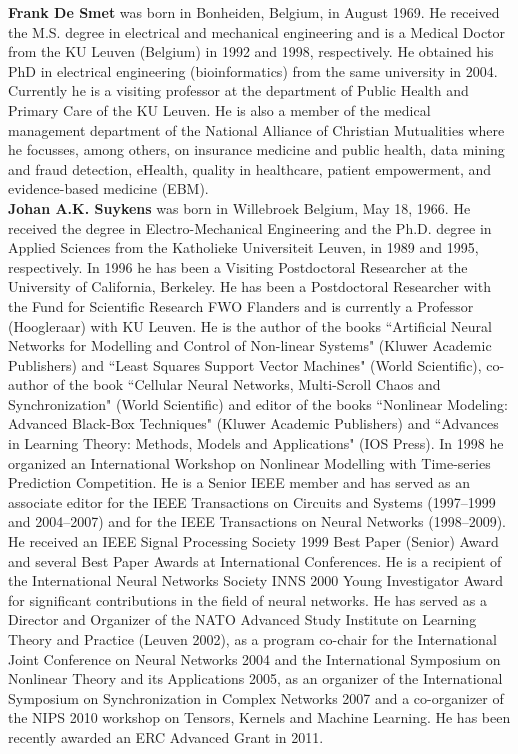 \documentclass[preprint,elsarticle-num,12pt]{elsarticle}
\begin{document}
{\noindent}\textbf{Frank De Smet} was born in Bonheiden, Belgium, in August 1969. He received the M.S. degree in electrical and mechanical engineering and is a Medical Doctor from the KU Leuven (Belgium) in 1992 and 1998, respectively. He obtained his PhD in electrical engineering (bioinformatics) from the same university in 2004. Currently he is a visiting professor at the department of Public Health and Primary Care of the KU Leuven. He is also a member of the medical management department of the National Alliance of Christian Mutualities where he focusses, among others, on insurance medicine and public health, data mining and fraud detection, eHealth, quality in healthcare, patient empowerment, and evidence-based medicine (EBM).\\

{\noindent}\textbf{Johan A.K. Suykens} was born in Willebroek Belgium, May 18, 1966. He received the degree in Electro-Mechanical Engineering and the Ph.D. degree in Applied Sciences from the Katholieke Universiteit Leuven, in 1989 and 1995, respectively. In 1996 he has been a Visiting Postdoctoral Researcher at the University of California, Berkeley. He has been a Postdoctoral Researcher with the Fund for Scientific Research FWO Flanders and is currently a Professor (Hoogleraar) with KU Leuven. He is the author of the books ``Artificial Neural Networks for Modelling and Control of Non-linear Systems" (Kluwer Academic Publishers) and ``Least Squares Support Vector Machines" (World Scientific), co-author of the book ``Cellular Neural Networks, Multi-Scroll Chaos and Synchronization" (World Scientific) and editor of the books ``Nonlinear Modeling: Advanced Black-Box Techniques" (Kluwer Academic Publishers) and ``Advances in Learning Theory: Methods, Models and Applications" (IOS Press). In 1998 he organized an International Workshop on Nonlinear Modelling with Time-series Prediction Competition. He is a Senior IEEE member and has served as an associate editor for the IEEE Transactions on Circuits and Systems (1997--1999 and 2004--2007) and for the IEEE Transactions on Neural Networks (1998--2009). He received an IEEE Signal Processing Society 1999 Best Paper (Senior) Award and several Best Paper Awards at International Conferences. He is a recipient of the International Neural Networks Society INNS 2000 Young Investigator Award for significant contributions in the field of neural networks. He has served as a Director and Organizer of the NATO Advanced Study Institute on Learning Theory and Practice (Leuven 2002), as a program co-chair for the International Joint Conference on Neural Networks 2004 and the International Symposium on Nonlinear Theory and its Applications 2005, as an organizer of the International Symposium on Synchronization in Complex Networks 2007 and a co-organizer of the NIPS 2010 workshop on Tensors, Kernels and Machine Learning. He has been recently awarded an ERC Advanced Grant in 2011. \\
\end{document}
